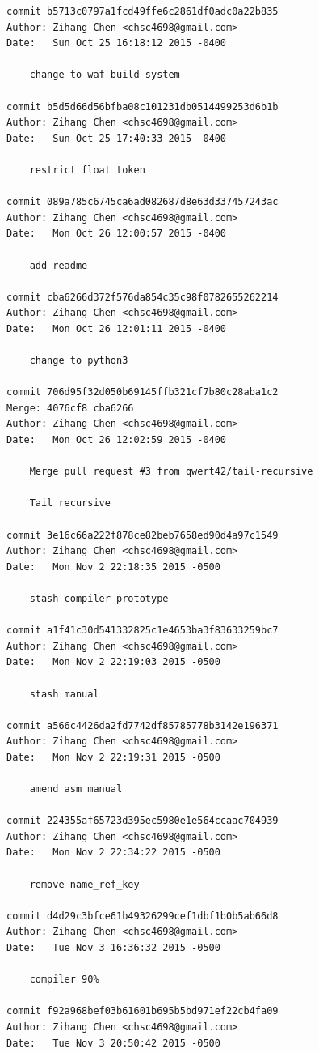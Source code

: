 \documentclass{report}
\begin{document}
\begin{appendices}
\begin{verbatim}
commit b5713c0797a1fcd49ffe6c2861df0adc0a22b835
Author: Zihang Chen <chsc4698@gmail.com>
Date:   Sun Oct 25 16:18:12 2015 -0400

    change to waf build system

commit b5d5d66d56bfba08c101231db0514499253d6b1b
Author: Zihang Chen <chsc4698@gmail.com>
Date:   Sun Oct 25 17:40:33 2015 -0400

    restrict float token

commit 089a785c6745ca6ad082687d8e63d337457243ac
Author: Zihang Chen <chsc4698@gmail.com>
Date:   Mon Oct 26 12:00:57 2015 -0400

    add readme

commit cba6266d372f576da854c35c98f0782655262214
Author: Zihang Chen <chsc4698@gmail.com>
Date:   Mon Oct 26 12:01:11 2015 -0400

    change to python3

commit 706d95f32d050b69145ffb321cf7b80c28aba1c2
Merge: 4076cf8 cba6266
Author: Zihang Chen <chsc4698@gmail.com>
Date:   Mon Oct 26 12:02:59 2015 -0400

    Merge pull request #3 from qwert42/tail-recursive
    
    Tail recursive

commit 3e16c66a222f878ce82beb7658ed90d4a97c1549
Author: Zihang Chen <chsc4698@gmail.com>
Date:   Mon Nov 2 22:18:35 2015 -0500

    stash compiler prototype

commit a1f41c30d541332825c1e4653ba3f83633259bc7
Author: Zihang Chen <chsc4698@gmail.com>
Date:   Mon Nov 2 22:19:03 2015 -0500

    stash manual

commit a566c4426da2fd7742df85785778b3142e196371
Author: Zihang Chen <chsc4698@gmail.com>
Date:   Mon Nov 2 22:19:31 2015 -0500

    amend asm manual

commit 224355af65723d395ec5980e1e564ccaac704939
Author: Zihang Chen <chsc4698@gmail.com>
Date:   Mon Nov 2 22:34:22 2015 -0500

    remove name_ref_key

commit d4d29c3bfce61b49326299cef1dbf1b0b5ab66d8
Author: Zihang Chen <chsc4698@gmail.com>
Date:   Tue Nov 3 16:36:32 2015 -0500

    compiler 90%

commit f92a968bef03b61601b695b5bd971ef22cb4fa09
Author: Zihang Chen <chsc4698@gmail.com>
Date:   Tue Nov 3 20:50:42 2015 -0500


\end{verbatim}
\end{appendices}
\end{document}
